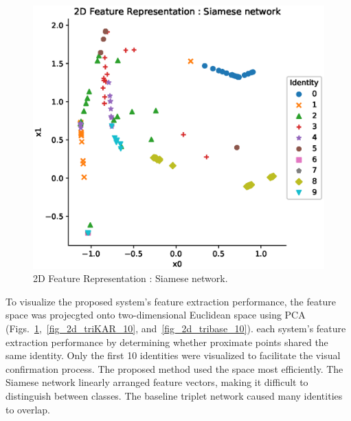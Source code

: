 \begin{figure}[!ht]
    \includegraphics[width=\textwidth]{fig_2d_siam_10_v1.eps}
    \caption{2D Feature Representation : Siamese network.} \label{fig_2d_siam_10}
\end{figure}
To visualize the proposed system's feature extraction performance, the feature space was projecgted onto two-dimensional Euclidean space using PCA (Figs.~\ref{fig_2d_siam_10},~\ref{fig_2d_triKAR_10}, and~\ref{fig_2d_tribase_10}). each system's feature extraction performance by determining whether proximate points shared the same identity. Only the first 10 identities were visualized to facilitate the visual confirmation process.
The proposed method used the space most efficiently. The Siamese network linearly arranged feature vectors, making it difficult to distinguish between classes. The baseline triplet network caused many identities to overlap.